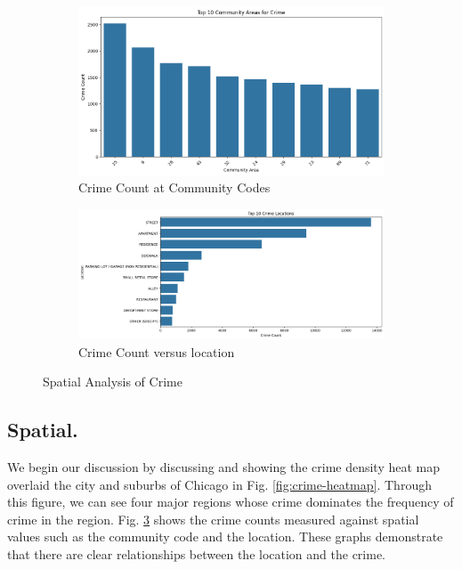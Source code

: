 \documentclass{article}
\begin{document}
\begin{figure}
     \centering
     \begin{subfigure}[b]{0.45\textwidth}
         \centering
         \includegraphics[width=\textwidth]{deep-learning-im/crime-community.png}
         \caption{Crime Count at Community Codes}
         \label{fig:crime-community}
     \end{subfigure}
     \hfill
     \begin{subfigure}[b]{0.45\textwidth}
         \centering
         \includegraphics[width=\textwidth]{deep-learning-im/crime-location.png}
         \caption{Crime Count versus location}
         \label{fig:crime-location}
     \end{subfigure}
        \caption{Spatial Analysis of Crime}
        \label{fig:spatial}
\end{figure}


\subsection{Spatial.} We begin our discussion by discussing and showing the crime density heat map overlaid the city and suburbs of Chicago in Fig. \ref{fig:crime-heatmap}. Through this figure, we can see four major regions whose crime dominates the frequency of crime in the region. Fig. \ref{fig:spatial} shows the crime counts measured against spatial values such as the community code and the location. These graphs demonstrate that there are clear relationships between the location and the crime. 
\end{document}

